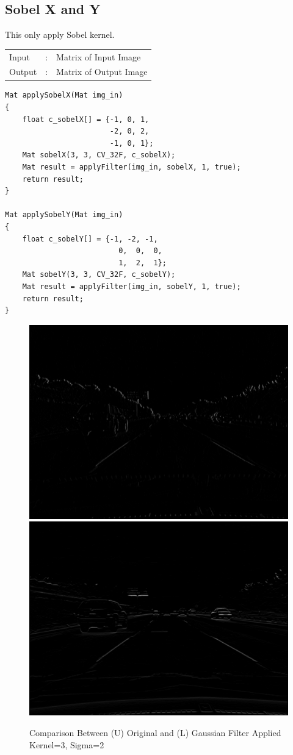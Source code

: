 \documentclass[12pt,a4paper]{report}
\begin{document}
\subsection{Sobel X and Y}
This only apply Sobel kernel.
\begin{tabular}{lll}
  Input  & : & Matrix of Input Image  \\
  Output & : & Matrix of Output Image \\
\end{tabular}
\begin{lstlisting}
Mat applySobelX(Mat img_in)
{
    float c_sobelX[] = {-1, 0, 1,
                        -2, 0, 2,
                        -1, 0, 1};
    Mat sobelX(3, 3, CV_32F, c_sobelX);
    Mat result = applyFilter(img_in, sobelX, 1, true);
    return result;
}

Mat applySobelY(Mat img_in)
{
    float c_sobelY[] = {-1, -2, -1,
                          0,  0,  0,
                          1,  2,  1};
    Mat sobelY(3, 3, CV_32F, c_sobelY);
    Mat result = applyFilter(img_in, sobelY, 1, true);
    return result;
}
\end{lstlisting}
\begin{figure}[!htb]
  \centering
  \includegraphics[height=0.4\paperheight]{output/img2_q2_SOBEL_X.png}
  \includegraphics[height=0.4\paperheight]{output/img2_q2_SOBEL_Y.png}
  \caption{Comparison Between (U) Original and (L) Gaussian Filter Applied Kernel=3, Sigma=2}
\end{figure}
\end{document}
